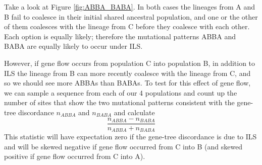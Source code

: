 Take a look at Figure \ref{fig:ABBA_BABA}. In both cases the lineages from A and B fail to coalesce in
their initial shared ancestral population, and one or the other of them
coalesces with the lineage from C before they coalesce with each other. Each option is equally
likely; therefore the mutational patterns ABBA and BABA are equally likely to occur under ILS.  

However, if gene flow occurs from population C into population B, in addition to ILS the lineage from B can more recently coalesce with the lineage from C, and so we should see more ABBAs than BABAs. To test for this effect of gene flow, we can sample a sequence from each of our 4 populations and count up the number of sites that show the two mutational patterns consistent with the gene-tree discordance $n_{ABBA}$ and
$n_{BABA}$ and calculate
\begin{equation}
\frac{n_{ABBA}-n_{BABA}}{n_{ABBA}+n_{BABA}}
\end{equation}
This statistic will have expectation zero if the gene-tree discordance is due to ILS and will be skewed negative if gene flow
occurred from C into B (and skewed positive if gene flow occurred from C into A).
